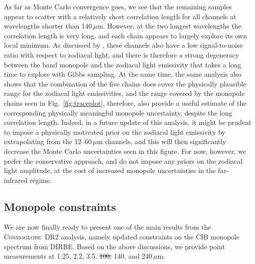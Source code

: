 \documentclass{aa}
\newcommand{\cosmoglobe}{\textsc{Cosmoglobe}}
\begin{document}
As far as Monte Carlo convergence goes, we see that the remaining
samples appear to scatter with a relatively short correlation length
for all channels at wavelengths shorter than
140$\,\mu\mathrm{m}$. However, at the two longest wavelengths the
correlation length is very long, and each chain appears to largely explore
its own local minimum. As discussed by \citet{CG02_02}, these channels
also have a low signal-to-noise ratio with respect to zodiacal light,
and there is therefore a strong degeneracy between the band monopole
and the zodiacal light emissivity that takes a long time to explore
with Gibbs sampling. At the same time, the same analysis also shows
that the combination of the five chains does cover the physically
plausible range for the zodiacal light emissivities, and the range
covered by the monopole chains seen in Fig.~\ref{fig:traceplot},
therefore, also provide a useful estimate of the corresponding
physically meaningful monopole uncertainty, despite the long
correlation length. Indeed, in a future update of this analysis, it
might be prudent to impose a physically motivated prior on the
zodiacal light emissivity by extrapolating from the
12--60\,$\mu\mathrm{m}$ channels, and this will then significantly
decrease the Monte Carlo uncertainties seen in this figure. For now,
however, we prefer the conservative approach, and do not impose any
priors on the zodiacal light amplitude, at the cost of increased
monopole uncertainties in the far-infrared regime.

\subsection{Monopole constraints}

We are now finally ready to present one of the main results from the
\cosmoglobe\ DR2 analysis, namely updated constraints on the CIB
monopole spectrum from DIRBE. Based on the above discussions, we
provide point measurements at 1.25, 2.2, 3.5, \sout{100,} 140, and
240$\,\mu\mathrm{m}$.
\end{document}
